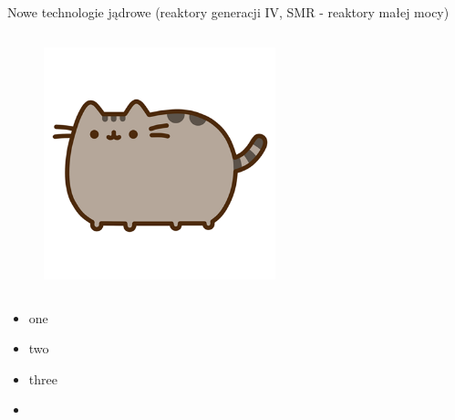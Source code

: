 \begin{columnframe}{Nowe technologie jądrowe (reaktory generacji IV, SMR - reaktory małej mocy)}
    \begin{column}{0.5\textwidth}
        \begin{figure}
            \centering
            \includegraphics[width=0.6\textwidth, frame]{images/pusheen.png}
        \end{figure}
    \end{column}
    \begin{column}{0.5\textwidth}
        \begin{itemize}
            \item one \keV
            \item two \MeV
            \item three \GeV
            \item \aegis
        \end{itemize}
    \end{column}
\end{columnframe}

